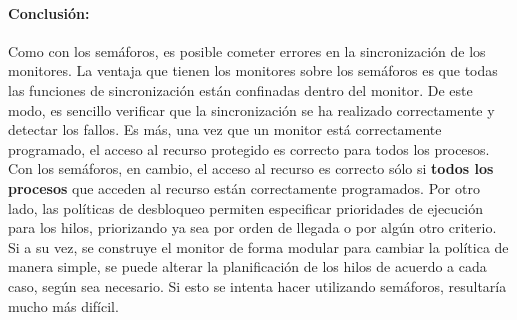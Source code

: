 \paragraph{Conclusión:}
Como con los semáforos, es posible cometer errores en la sincronización de los
monitores. La ventaja que tienen los monitores sobre los semáforos es que todas
las funciones de sincronización están confinadas dentro del monitor. De este
modo, es sencillo verificar que la sincronización se ha realizado correctamente
y detectar los fallos. Es más, una vez que un monitor está correctamente
programado, el acceso al recurso protegido es correcto para todos los procesos.
Con los semáforos, en cambio, el acceso al recurso es correcto sólo si
\textbf{todos los procesos} que acceden al recurso están correctamente
programados.\cite{SistOpStallings}
Por otro lado, las políticas de desbloqueo permiten especificar prioridades de
ejecución para los hilos, priorizando ya sea por orden de llegada o por algún
otro criterio. Si a su vez, se construye el monitor de forma modular para
cambiar la política de manera simple, se puede alterar la planificación de los
hilos de acuerdo a cada caso, según sea necesario. Si esto se intenta hacer
utilizando semáforos, resultaría mucho más difícil.
